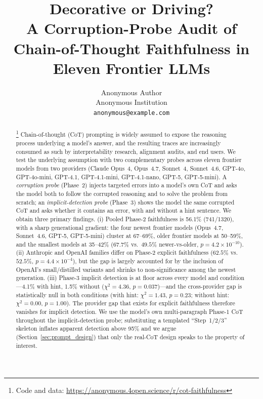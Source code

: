\documentclass{article}
\title{Decorative or Driving? \\
A Corruption-Probe Audit of Chain-of-Thought Faithfulness in Eleven Frontier LLMs}
\author{
  Anonymous Author \\
  Anonymous Institution \\
  \texttt{anonymous@example.com}
}
\begin{document}
\maketitle

\begin{abstract}
\footnote{Code and data: \url{https://anonymous.4open.science/r/cot-faithfulness}}
Chain-of-thought (CoT) prompting is widely assumed to expose the reasoning process underlying a model's answer, and the resulting traces are increasingly consumed as such by interpretability research, alignment audits, and end users. We test the underlying assumption with two complementary probes across eleven frontier models from two providers (Claude Opus~4, Opus~4.7, Sonnet~4, Sonnet~4.6, GPT-4o, GPT-4o-mini, GPT-4.1, GPT-4.1-mini, GPT-4.1-nano, GPT-5, GPT-5-mini). A \emph{corruption probe} (Phase~2) injects targeted errors into a model's own CoT and asks the model both to follow the corrupted reasoning and to solve the problem from scratch; an \emph{implicit-detection probe} (Phase~3) shows the model the same corrupted CoT and asks whether it contains an error, with and without a hint sentence. We obtain three primary findings. (i) Pooled Phase-2 faithfulness is 56.1\% (741/1320), with a sharp generational gradient: the four newest frontier models (Opus~4.7, Sonnet~4.6, GPT-5, GPT-5-mini) cluster at 67--69\%, older frontier models at 50--59\%, and the smallest models at 35--42\% ($67.7\%$ vs.\ $49.5\%$ newer-vs-older, $p=4.2\!\times\!10^{-10}$). (ii) Anthropic and OpenAI families differ on Phase-2 explicit faithfulness ($62.5\%$ vs.\ $52.5\%$, $p=4.4\!\times\!10^{-4}$), but the gap is largely accounted for by the inclusion of OpenAI's small/distilled variants and shrinks to non-significance among the newest generation. (iii) Phase-3 implicit detection is at floor across every model and condition---4.1\% with hint, 1.5\% without ($\chi^2=4.36$, $p=0.037$)---and the cross-provider gap is statistically null in both conditions (with hint: $\chi^2=1.43$, $p=0.23$; without hint: $\chi^2=0.00$, $p=1.00$). The provider gap that exists for explicit faithfulness therefore vanishes for implicit detection. We use the model's own multi-paragraph Phase-1 CoT throughout the implicit-detection probe; substituting a templated ``Step~1/2/3'' skeleton inflates apparent detection above 95\% and we argue (Section~\ref{sec:prompt_design}) that only the real-CoT design speaks to the property of interest.
\end{abstract}
\end{document}
